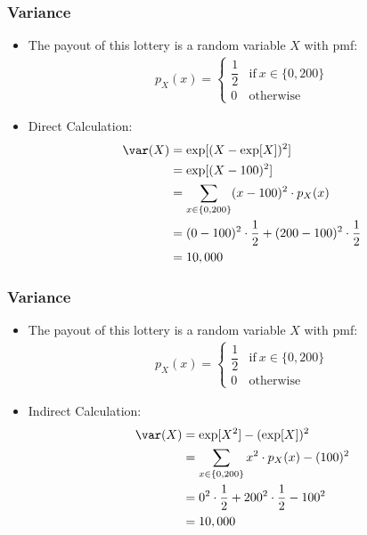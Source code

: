 \begin{frame}
\frametitle{Variance} 
\begin{itemize}
\item The payout of this lottery is a random variable $X$ with pmf:
\begin{align*}
p_X(x) = 
  \begin{cases}
  \dfrac{1}{2}  & \text{if}~ x \in \{0,200\}\\[1ex]
              0 & \text{otherwise}
  \end{cases}
\end{align*}
\item Direct Calculation:
\begin{align*}
\var(X) 
    & = \exp[(X-\exp[X])^2] \\
    & = \exp[(X-100)^2] \\
    & = \sum_{x\in\{0,200\}} (x - 100)^2\cdot p_X(x)\\
    & = (0-100)^2\cdot\frac{1}{2} + (200-100)^2\cdot\frac{1}{2}\\
    &  = 10,000 
\end{align*}
\end{itemize}
\end{frame}


\begin{frame}
\frametitle{Variance} 
\begin{itemize}
\item The payout of this lottery is a random variable $X$ with pmf:
\begin{align*}
p_X(x) = 
  \begin{cases}
  \dfrac{1}{2}  & \text{if}~ x \in \{0,200\}\\[1ex]
              0 & \text{otherwise}
  \end{cases}
\end{align*}
\item Indirect Calculation:
\begin{align*}
\var(X) 
    & = \exp[X^2]-(\exp[X])^2 \\
    & = \sum_{x\in\{0,200\}} x^2 \cdot p_X(x) - (100)^2\\
    & = 0^2 \cdot \frac{1}{2} + 200^2 \cdot \frac{1}{2} - 100^2 \\
    & = 10,000
\end{align*}
\end{itemize}
\end{frame}


